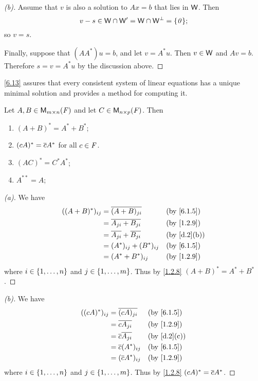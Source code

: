 \begin{proof}[(b)]
	Assume that \(v\) is also a solution to \(Ax = b\) that lies in \(\mathsf{W}\).
	Then
	\[
		v - s \in \W \cap \W' = \W \cap \W^{\perp} = \set{\zv};
	\]
	so \(v = s\).

	Finally, suppose that \((A A^*) u = b\), and let \(v = A^* u\).
	Then \(v \in \mathsf{W}\) and \(Av = b\).
	Therefore \(s = v = A^* u\) by the discussion above.
\end{proof}

\begin{note}
	\cref{6.13} assures that every consistent system of linear equations has a unique minimal solution and provides a method for computing it.
\end{note}

\exercisesection

\setcounter{ex}{4}
\begin{ex}\label{ex:6.3.5}
	Let \(A, B \in \ms\) and let \(C \in \ms[n][p][\F]\).
	Then
	\begin{enumerate}
		\item \((A + B)^* = A^* + B^*\);
		\item \((cA)^* = \overline{c} A^*\) for all \(c \in \mathit{F}\).
		\item \((AC)^* = C^* A^*\);
		\item \(A^{**} = A\);
	\end{enumerate}
\end{ex}

\begin{proof}[(a)]
	We have
	\begin{align*}
		((A + B)^*)_{i j} & = \conj{(A + B)_{j i}}            &  & \by{6.1.5}  \\
		                  & = \conj{A_{j i} + B_{j i}}        &  & \by{1.2.9}  \\
		                  & = \conj{A_{j i}} + \conj{B_{j i}} &  & \by{d.2}[b] \\
		                  & = (A^*)_{i j} + (B^*)_{i j}       &  & \by{6.1.5}  \\
		                  & = (A^* + B^*)_{i j}               &  & \by{1.2.9}
	\end{align*}
	where \(i \in \left\lbrace1, \dots, n\right\rbrace\) and \(j \in \left\lbrace1, \dots, m\right\rbrace\).
	Thus by \cref{1.2.8} \((A + B)^* = A^* + B^*\).
\end{proof}

\begin{proof}[(b)]
	We have
	\begin{align*}
		((cA)^*)_{i j} & = \conj{(cA)_{j i}}       &  & \by{6.1.5}  \\
		               & = \conj{c A_{j i}}        &  & \by{1.2.9}  \\
		               & = \conj{c} \conj{A_{j i}} &  & \by{d.2}[c] \\
		               & = \conj{c} (A^*)_{i j}    &  & \by{6.1.5}  \\
		               & = (\conj{c} A^*)_{i j}    &  & \by{1.2.9}
	\end{align*}
	where \(i \in \left\lbrace1, \dots, n\right\rbrace\) and \(j \in \left\lbrace1, \dots, m\right\rbrace\).
	Thus by \cref{1.2.8} \((cA)^* = \overline{c} A^*\).
\end{proof}


